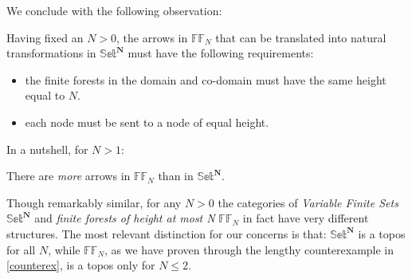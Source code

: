  	We conclude with the following observation:
 	\begin{remark}
 		Having fixed an $N>0$, the arrows in $\mathbb{FF}_N$ that can be translated into natural transformations in $\mathbb{Set}^\textbf{N}$ must have the following requirements:
 		\begin{itemize}
 			\item the finite forests in the domain and co-domain must have the same height equal to $N$.
 			\item each node must be sent to a node of equal height. 
 		\end{itemize}
 	\end{remark}
 	
 	In a nutshell, for $N > 1$: 
 	
 	\begin{remark}
 		There are \emph{more} arrows in $\mathbb{FF}_N$ than in $\mathbb{Set}^\textbf{N}$.	
 	\end{remark}
 	
 	     
\begin{remark}
	Though remarkably similar, for any $N>0$ the categories of \emph{Variable Finite Sets} $\mathbb{Set}^\textbf{N}$ and \emph{finite forests of height at most N} $\mathbb{FF}_N$ in fact have very different structures.
	\newline
	The most relevant distinction for our concerns is that: $\mathbb{Set}^\textbf{N}$ is a topos for all $N$, while $\mathbb{FF}_N$, as we have proven through the lengthy counterexample in \ref{counterex},  is a topos only for $N \leq 2$.
\end{remark}
 
 	\newpage
 ${}$ \newpage